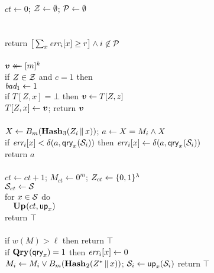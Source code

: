 \begin{figure*}
{
  \vspace{-7pt}
  \hfill{}\\[2pt]
    $ct \gets 0$;
    $\mathcal{Z} \gets \emptyset$;
    $\mathcal{P} \gets \emptyset$\\
    \\
    \\
    return $\big[\sum_x \textit{err}_i[x] \geq r\big] \wedge i \not\in \mathcal{P}$
  \\[6pt]
  \\[2pt]
    $\boldsymbol{v} \mathrel{\leftarrow\mkern-14mu\leftarrow} [m]^k$\\
    if $Z \in \mathcal{Z}$ and $c = 1$ then \\
    \tab $\textit{bad}_1 \gets 1$\\
    if $T[Z,x] = \bot$ then $\boldsymbol{v} \gets T[Z,z]$\\
    $T[Z,x] \gets \boldsymbol{v}$; return $\boldsymbol{v}$
  \\[6pt]
  \\[2pt]
    $X \gets {B}_m(\textup{\textbf{Hash}}\hspace{0.5pt}_3(Z_i \, \| \, x))$;
    $a \gets X = M_i \wedge X$\\
    if $\textit{err}_i[x] < \delta(a,\mathsf{qry}_x(\mathcal{S}_i))$ then
          $\textit{err}_i[x] \gets \delta(a,\mathsf{qry}_x(\mathcal{S}_i))$\\
    return $a$
  \\[6pt]
  \oraclev{$\REPO(\col)$}\hfill {}\\[2pt]
    $ct \gets ct+1$;
    $M_{ct} \gets 0^m$;
    $Z_{ct} \gets \{0,1\}^\lambda$\diffplus{$\setminus \setZ$}\\
    $\mathcal{S}_{ct} \gets \mathcal{S}$\\
    for $x \in \mathcal{S}$ do\\
    $\hspace*{10pt}\textup{\textbf{Up}}\hspace{0.5pt}(ct, \mathsf{up}_x)$\\
    return $\top$
  \\[6pt]
  \\[2pt]
    if $w(M) > \ell$ then return $\top$\\
    if $\textup{\textbf{Qry}}\hspace{0.5pt}(\mathsf{qry}_x) = 1$ then $\textit{err}_i[x] \gets 0$\\
    $M_i \gets M_i \vee {B}_m(\textup{\textbf{Hash}}\hspace{0.5pt}_2(Z^* \, \| \, x))$;
    $\mathcal{S}_i \gets \mathsf{up}_x(\mathcal{S}_i)$
    return $\top$
  \\[6pt]
}
\end{figure*}
